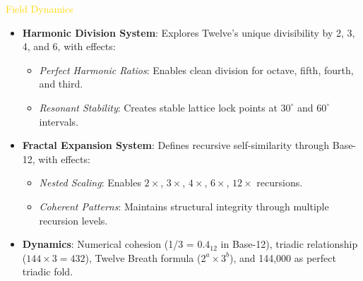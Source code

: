 \textcolor{gold}{ Field Dynamics } \\
\begin{itemize}
    \item \textbf{Harmonic Division System}: Explores Twelve's unique divisibility by 2, 3, 4, and 6, with effects:
    \begin{itemize}\setlength{\itemsep}{0.2cm}
        \item \textit{Perfect Harmonic Ratios}: Enables clean division for octave, fifth, fourth, and third.
        \item \textit{Resonant Stability}: Creates stable lattice lock points at \(30^\circ\) and \(60^\circ\) intervals.
    \end{itemize}
    \item \textbf{Fractal Expansion System}: Defines recursive self-similarity through Base-12, with effects:
    \begin{itemize}\setlength{\itemsep}{0.2cm}
        \item \textit{Nested Scaling}: Enables \(2\times\), \(3\times\), \(4\times\), \(6\times\), \(12\times\) recursions.
        \item \textit{Coherent Patterns}: Maintains structural integrity through multiple recursion levels.
    \end{itemize}
    \item \textbf{Dynamics}: Numerical cohesion (1/3 = \(0.4_{12}\) in Base-12), triadic relationship (\(144 \times 3 = 432\)), Twelve Breath formula (\(2^a \times 3^b\)), and 144,000 as perfect triadic fold.
\end{itemize}

